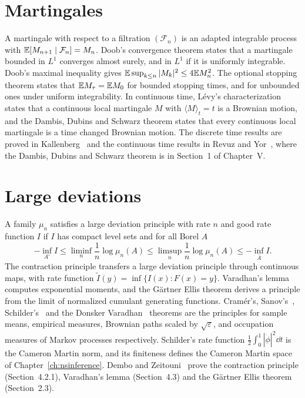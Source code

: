 \section{Martingales}

A martingale with respect to a filtration $(\mathcal{F}_n)$ is an adapted integrable process with $\mathbb{E}[M_{n+1}\mid\mathcal{F}_n] = M_n$. Doob's convergence theorem states that a martingale bounded in $L^1$ converges almost surely, and in $L^1$ if it is uniformly integrable. Doob's maximal inequality gives $\mathbb{E}\sup_{k\leq n}|M_k|^2\leq4\mathbb{E} M_n^2$. The optional stopping theorem states that $\mathbb{E} M_\tau = \mathbb{E} M_0$ for bounded stopping times, and for unbounded ones under uniform integrability. In continuous time, L\'evy's characterization states that a continuous local martingale $M$ with $\langle M\rangle_t = t$ is a Brownian motion, and the Dambis, Dubins and Schwarz theorem states that every continuous local martingale is a time changed Brownian motion. The discrete time results are proved in Kallenberg~\cite{kallenberg2002} and the continuous time results in Revuz and Yor~\cite{revuzyor}, where the Dambis, Dubins and Schwarz theorem is in Section~1 of Chapter~V.

\section{Large deviations}

A family $\mu_n$ satisfies a large deviation principle with rate $n$ and good rate function $I$ if $I$ has compact level sets and for all Borel $A$
\[
-\inf_{A^\circ}I\leq\liminf_n\frac1n\log\mu_n(A)\leq\limsup_n\frac1n\log\mu_n(A)\leq-\inf_{\bar A}I.
\]
The contraction principle transfers a large deviation principle through continuous maps, with rate function $\tilde I(y) = \inf\{I(x):F(x) = y\}$. Varadhan's lemma computes exponential moments, and the G\"artner Ellis theorem derives a principle from the limit of normalized cumulant generating functions. Cram\'er's, Sanov's~\cite{sanov1957}, Schilder's~\cite{schilder1966} and the Donsker Varadhan~\cite{donsker1975} theorems are the principles for sample means, empirical measures, Brownian paths scaled by $\sqrt\varepsilon$, and occupation measures of Markov processes respectively. Schilder's rate function $\frac12\int_0^1|\dot\phi|^2\dd t$ is the Cameron Martin norm, and its finiteness defines the Cameron Martin space of Chapter~\ref{ch:nsinference}. Dembo and Zeitouni~\cite{dembozeitouni} prove the contraction principle (Section~4.2.1), Varadhan's lemma (Section~4.3) and the G\"artner Ellis theorem (Section~2.3).

